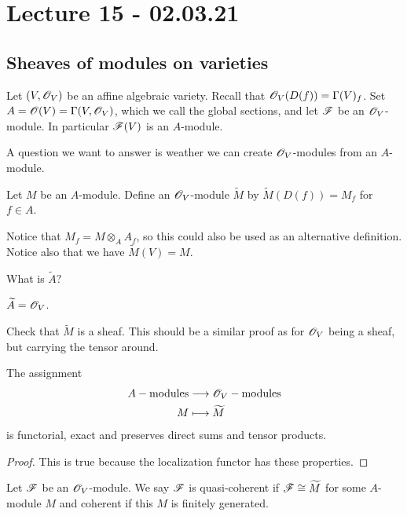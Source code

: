 
\section{Lecture 15 - 02.03.21}

\subsection{Sheaves of modules on varieties}
Let $(V, \mathscr{O}_V)$ be an affine algebraic variety. Recall that $\mathscr{O}_V(D(f))=\Gamma(V)_f$. Set $A=\mathscr{O}(V)=\Gamma(V, \mathscr{O}_V)$, which we call the global sections, and let $\mathscr{F}$ be an $\mathscr{O}_V$-module. In particular $\mathscr{F}(V)$ is an $A$-module. 

A question we want to answer is weather we can create $\mathscr{O}_V$-modules from an $A$-module.

\begin{definition}
Let $M$ be an $A$-module. Define an $\mathscr{O}_V$-module $\widetilde{M}$ by $\widetilde{M}(D(f))=M_f$ for $f\in A$. 
\end{definition}

Notice that $M_f = M\otimes_A A_f$, so this could also be used as an alternative definition. Notice also that we have $\widetilde{M}(V)=M$. 

\begin{problem}
What is $\widetilde{A}?$ 
\end{problem}
\begin{solution}
$\widetilde{A}=\mathscr{O}_V$.
\end{solution}

\begin{problem}
Check that $\widetilde{M}$ is a sheaf. This should be a similar proof as for $\mathscr{O}_V$ being a sheaf, but carrying the tensor around.
\end{problem}

\begin{proposition}
The assignment
\begin{align*}
    A-\text{modules}&\longrightarrow \mathscr{O}_V-\text{modules} \\
    M &\longmapsto \widetilde{M}
\end{align*}
is functorial, exact and preserves direct sums and tensor products. 
\end{proposition}
\begin{proof}
This is true because the localization functor has these properties. 
\end{proof}

\begin{definition}
Let $\mathscr{F}$ be an $\mathscr{O}_V$-module. We say $\mathscr{F}$ is quasi-coherent if $\mathscr{F}\cong \widetilde{M}$ for some $A$-module $M$ and coherent if this $M$ is finitely generated. 
\end{definition}

